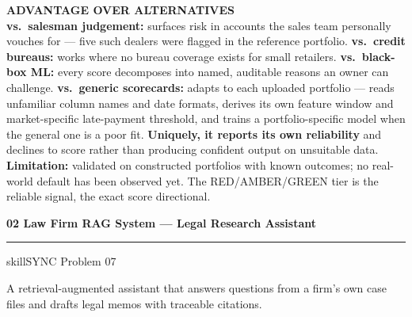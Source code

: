 \documentclass[10pt,a4paper]{article}
\newcommand{\projecthead}[3]{%
\vspace{2pt}
{\color{navy}\bfseries\large #1}\;%
{\color{gold}\rule[2pt]{7pt}{7pt}}\;%
{\color{slate}\small #2}\par\vspace{2pt}
{\color{slate}\small\itshape\raggedright #3\par}\vspace{4pt}}
\begin{document}
\vspace{3pt}
\begin{tcolorbox}[colback=parch,colframe=rule,boxrule=0.4pt,arc=1.5pt,
                  left=6pt,right=6pt,top=4pt,bottom=4pt]
{\color{navy}\bfseries\footnotesize ADVANTAGE OVER ALTERNATIVES}\\[2pt]
\footnotesize
\textbf{vs.\ salesman judgement:} surfaces risk in accounts the sales team personally vouches for --- five such dealers were flagged in the reference portfolio.\;
\textbf{vs.\ credit bureaus:} works where no bureau coverage exists for small retailers.\;
\textbf{vs.\ black-box ML:} every score decomposes into named, auditable reasons an owner can challenge.\;
\textbf{vs.\ generic scorecards:} adapts to each uploaded portfolio --- reads unfamiliar column names and date formats, derives its own feature window and market-specific late-payment threshold, and trains a portfolio-specific model when the general one is a poor fit.\;
\textbf{Uniquely, it reports its own reliability} and declines to score rather than producing confident output on unsuitable data.\\[3pt]
{\color{slate}\scriptsize \textbf{Limitation:} validated on constructed portfolios with known outcomes; no real-world default has been observed yet. The RED/AMBER/GREEN tier is the reliable signal, the exact score directional.}
\end{tcolorbox}

\vspace{7pt}

\projecthead{02\;\; Law Firm RAG System — Legal Research Assistant}
{skillSYNC Problem 07}
{A retrieval-augmented assistant that answers questions from a firm's own case files and drafts legal memos with traceable citations.}
\end{document}
